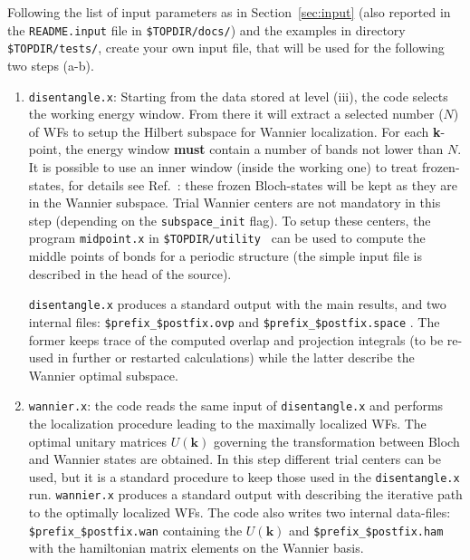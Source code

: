 Following the list of input parameters as in
Section~\ref{sec:input} (also reported in the {\tt README.input} file
in {\tt \$TOPDIR/docs/}) and the examples in directory {\tt \$TOPDIR/tests/},
create your own input file, that will be used for the following two steps (a-b).
\renewcommand{\theenumi}{\alph{enumi}}
\renewcommand{\labelenumi}{\theenumi)}
%
%
\begin{enumerate}
\item {\tt disentangle.x}: Starting from the data stored at level (iii),
      the code selects the working energy window. From there
      it will extract a selected number ($N$) of WFs to setup the
      Hilbert subspace for Wannier localization.
      For each \textbf{k}-point, the energy window {\bf must}
      contain a number of bands not lower than $N$.
      It is possible to use an inner window (inside the working one) to
      treat frozen-states, for details see Ref.~\cite{ivo2}:
      these frozen Bloch-states will be kept as they are in the Wannier subspace.
      Trial Wannier centers are not mandatory in this step (depending
      on the {\tt subspace\_init} flag).
      To setup these centers, the program {\tt midpoint.x} in 
      {\tt \$TOPDIR/utility } can be used to compute
      the middle points of bonds for a periodic structure (the simple input file 
      is described in the head of the source). 

      {\tt disentangle.x} produces a standard output with the main results,
      and two internal files: {\tt \$prefix\_\$postfix.ovp} and
      {\tt \$prefix\_\$postfix.space} . The former keeps trace of the
      computed overlap and projection integrals (to be re-used in further
      or restarted calculations) while the latter describe the Wannier optimal
      subspace.

\item {\tt wannier.x}: the code reads the same input of {\tt disentangle.x} and
      performs the localization
      procedure leading to the maximally localized WFs.
      The optimal unitary matrices $U(\mathbf{k})$ governing the transformation between
      Bloch and Wannier states are obtained.
      In this step different trial centers can be used, but it is a standard procedure
      to keep those used in the {\tt disentangle.x} run.
      {\tt wannier.x} produces a standard output with describing the iterative
      path to the optimally localized WFs.
      The code also writes two internal data-files: {\tt \$prefix\_\$postfix.wan}
      containing the $U(\mathbf{k})$ and {\tt \$prefix\_\$postfix.ham} with the
      hamiltonian matrix elements on the Wannier basis.
\end{enumerate}
%
%

